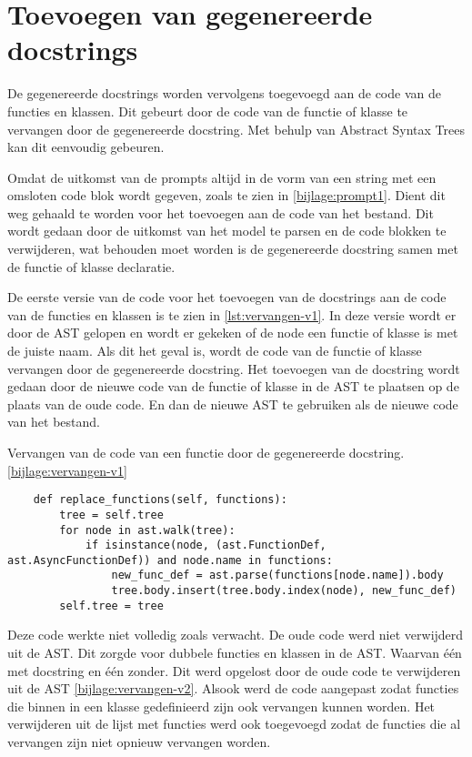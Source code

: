 \section{Toevoegen van gegenereerde docstrings}
\label{sec:bestanddocumentatie-vervangen}
De gegenereerde docstrings worden vervolgens toegevoegd aan de code van de functies en klassen.
Dit gebeurt door de code van de functie of klasse te vervangen door de gegenereerde docstring.
Met behulp van Abstract Syntax Trees kan dit eenvoudig gebeuren.

Omdat de uitkomst van de prompts altijd in de vorm van een string met een omsloten code blok wordt gegeven, zoals te zien in \ref{bijlage:prompt1}.
Dient dit weg gehaald te worden voor het toevoegen aan de code van het bestand. 
Dit wordt gedaan door de uitkomst van het model te parsen en de code blokken te verwijderen, wat behouden moet worden is de gegenereerde docstring samen met de functie of klasse declaratie.

De eerste versie van de code voor het toevoegen van de docstrings aan de code van de functies en klassen is te zien in \ref{lst:vervangen-v1}.
In deze versie wordt er door de AST gelopen en wordt er gekeken of de node een functie of klasse is met de juiste naam. 
Als dit het geval is, wordt de code van de functie of klasse vervangen door de gegenereerde docstring.
Het toevoegen van de docstring wordt gedaan door de nieuwe code van de functie of klasse in de AST te plaatsen op de plaats van de oude code.
En dan de nieuwe AST te gebruiken als de nieuwe code van het bestand.

\begin{listing}
    \caption[Code voor het vervangen van een docstring]{Vervangen van de code van een functie door de gegenereerde docstring. \ref{bijlage:vervangen-v1}}
    \label{lst:vervangen-v1}
    \begin{verbatim}
    def replace_functions(self, functions):
        tree = self.tree
        for node in ast.walk(tree):
            if isinstance(node, (ast.FunctionDef, ast.AsyncFunctionDef)) and node.name in functions:
                new_func_def = ast.parse(functions[node.name]).body
                tree.body.insert(tree.body.index(node), new_func_def)        
        self.tree = tree

    \end{verbatim}
\end{listing}

Deze code werkte niet volledig zoals verwacht. De oude code werd niet verwijderd uit de AST. Dit zorgde voor dubbele functies en klassen in de AST.
Waarvan één met docstring en één zonder. Dit werd opgelost door de oude code te verwijderen uit de AST \ref{bijlage:vervangen-v2}.
Alsook werd de code aangepast zodat functies die binnen in een klasse gedefinieerd zijn ook vervangen kunnen worden.
Het verwijderen uit de lijst met functies werd ook toegevoegd zodat de functies die al vervangen zijn niet opnieuw vervangen worden.

